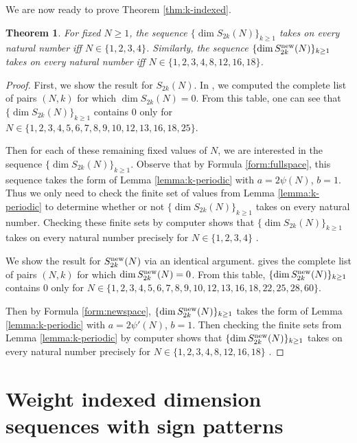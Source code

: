 \documentclass[12pt,letterpaper,reqno]{amsart}
\newtheorem{theorem}{Theorem}[section]
\theoremstyle{definition}
\numberwithin{equation}{section}
\numberwithin{figure}{section}
\numberwithin{table}{section}
\newcommand{\nw}{{\textnormal{new}}}
\begin{document}
We are now ready to prove Theorem \ref{thm:k-indexed}.
{
\renewcommand{\thetheorem}{\ref{thm:k-indexed}}
\begin{theorem} 
    For fixed $N \ge 1$, the sequence $\{ \dim S_{2k}(N) \}_{k\ge1}$ takes on every natural number 
    iff $N \in \{1,2,3,4\}$.
    Similarly, the sequence $\{ \dim S_{2k}^\nw(N) \}_{k\ge1}$ 
    takes on every natural number iff $N \in \{1,2,3,4,8,12,16,18\}$.
\end{theorem}
\addtocounter{theorem}{-1}
}
\begin{proof}
    First, we show the result for $S_{2k}(N)$. In \cite[Table 2.6]{ross}, we computed the complete list of pairs $(N,k)$ for which $\dim S_{2k}(N) = 0$. From this table, one can see that $\{ \dim S_{2k}(N) \}_{k\ge1}$ contains $0$ only for $N \in \{1, 2, 3, 4, 5, 6, 7, 8, 9, 10, 12, 13, 16, 18, 25\}$.

    Then for each of these remaining fixed values of $N$, we are interested in the sequence $\{ \dim S_{2k}(N) \}_{k\ge1}$. Observe that by Formula \ref{form:fullspace}, this sequence takes the form of Lemma \ref{lemma:k-periodic} with $a=2\psi(N)$, $b=1$.
    Thus we only need to check the finite set of values from Lemma \ref{lemma:k-periodic} to determine whether or not $\{ \dim S_{2k}(N) \}_{k\ge1}$ takes on every natural number. Checking these finite sets by computer shows that  $\{ \dim S_{2k}(N) \}_{k\ge1}$ takes on every natural number precisely for $N \in \{1,2,3,4\}$ \cite{ross-code}.

    We show the result for $S_{2k}^\nw(N)$ via an identical argument. \cite[Table 6.2]{ross} gives the complete list of pairs $(N,k)$ for which $\dim S_{2k}^\nw(N) = 0$. From this table, $\{ \dim S_{2k}^\nw(N) \}_{k\ge1}$ contains $0$ only for $N \in \{1, 2, 3, 4, 5, 6, 7, 8, 9, 10, 12, 13, 16, 18, 22, 25, 28, 60\}$.

    Then by Formula \ref{form:newspace}, $\{ \dim S_{2k}^\nw(N) \}_{k\ge1}$ takes the form of Lemma \ref{lemma:k-periodic} with $a=2\psi'(N)$, $b=1$.
    Then checking the finite sets from Lemma \ref{lemma:k-periodic} by computer shows that $\{ \dim S_{2k}^\nw(N) \}_{k\ge1}$ takes on every natural number precisely for $N \in \{1,2,3,4,8,12,16,18\}$ \cite{ross-code}.
\end{proof}




\section{Weight indexed dimension sequences with sign patterns}
\end{document}
